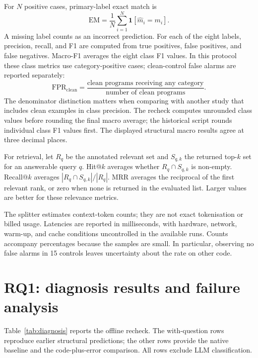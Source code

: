 For $N$ positive cases, primary-label exact match is
\begin{equation}
\mathrm{EM}=\frac{1}{N}\sum_{i=1}^{N}\mathbf{1}[\hat{m}_i=m_i].
\end{equation}
A missing label counts as an incorrect prediction. For each of the eight labels, precision, recall, and F1 are computed from true positives, false positives, and false negatives. Macro-F1 averages the eight class F1 values. In this protocol these class metrics use category-positive cases; clean-control false alarms are reported separately:
\begin{equation}
\mathrm{FPR}_{\mathrm{clean}}=
\frac{\text{clean programs receiving any category}}{\text{number of clean programs}}.
\end{equation}
The denominator distinction matters when comparing with another study that includes clean examples in class precision. The recheck computes unrounded class values before rounding the final macro average; the historical script rounds individual class F1 values first. The displayed structural macro results agree at three decimal places.

For retrieval, let $R_q$ be the annotated relevant set and $S_{q,k}$ the returned top-$k$ set for an answerable query $q$. Hit@$k$ averages whether $R_q\cap S_{q,k}$ is non-empty. Recall@$k$ averages $|R_q\cap S_{q,k}|/|R_q|$. MRR averages the reciprocal of the first relevant rank, or zero when none is returned in the evaluated list. Larger values are better for these relevance metrics.

The splitter estimates context-token counts; they are not exact tokenisation or billed usage. Latencies are reported in milliseconds, with hardware, network, warm-up, and cache conditions uncontrolled in the available runs. Counts accompany percentages because the samples are small. In particular, observing no false alarms in 15 controls leaves uncertainty about the rate on other code.

\section{RQ1: diagnosis results and failure analysis}
\label{sec:diagnosisresults}
Table~\ref{tab:diagnosis} reports the offline recheck. The with-question rows reproduce earlier structural predictions; the other rows provide the native baseline and the code-plus-error comparison. All rows exclude LLM classification.

